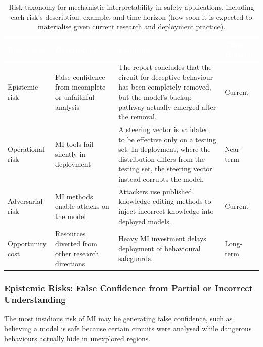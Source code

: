 \begin{table}[tb]
\centering
\caption{Risk taxonomy for mechanistic interpretability in safety applications, including each risk’s description, example, and time horizon (how soon it is expected to materialise given current research and deployment practice).}
\label{tab:mi-risks}
\renewcommand{\arraystretch}{1.3}
\begin{tabular}{>{\raggedright\arraybackslash}p{2.5cm} >{\raggedright\arraybackslash}p{5cm} >{\raggedright\arraybackslash}p{5cm} >{\raggedright\arraybackslash}p{2.5cm}}
\toprule
\rowcolor{tableheader!80} \textcolor{white}{\textbf{Risk Class}} & \textcolor{white}{\textbf{Description}} & \textcolor{white}{\textbf{Example}} & \textcolor{white}{\textbf{Time Horizon}} \\
\midrule
\rowcolor{tablerow1} Epistemic risk & False confidence from incomplete or unfaithful analysis & The report concludes that the circuit for deceptive behaviour has been completely removed, but the model’s backup pathway actually emerged after the removal. & Current \\
\rowcolor{tablerow2} Operational risk & MI tools fail silently in deployment & A steering vector is validated to be effective only on a testing set. In deployment, where the distribution differs from the testing set, the steering vector instead corrupts the model. & Near-term \\
\rowcolor{tablerow1} Adversarial risk & MI methods enable attacks on the model & Attackers use published knowledge editing methods to inject incorrect knowledge into deployed models. & Current \\
\rowcolor{tablerow2} Opportunity cost & Resources diverted from other research directions & Heavy MI investment delays deployment of behavioural safeguards. & Long-term \\
\bottomrule
\end{tabular}
\end{table}

\subsubsection{Epistemic Risks: False Confidence from Partial or Incorrect Understanding}

The most insidious risk of MI may be generating false confidence, such as believing a model is safe because certain circuits were analysed while dangerous behaviours actually hide in unexplored regions.

